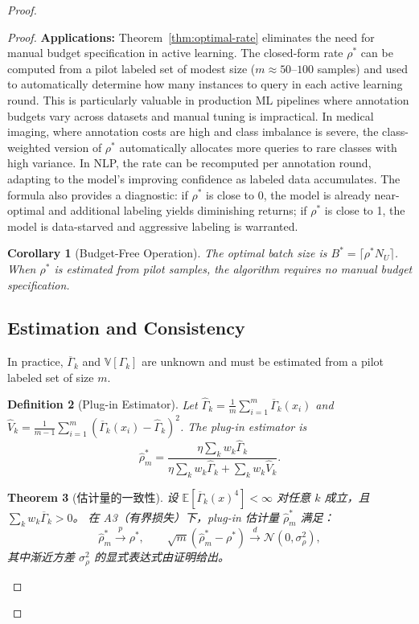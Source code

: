 \documentclass[12pt,a4paper]{article}
\newtheorem{theorem}{Theorem}[section]
\newtheorem{corollary}[theorem]{Corollary}
\newtheorem{definition}[theorem]{Definition}
\newcommand{\E}{\mathbb{E}}
\newcommand{\V}{\mathbb{V}}
\begin{document}
\begin{proof}
\begin{proof}
\medskip\noindent
\textbf{Applications:}
Theorem~\ref{thm:optimal-rate} eliminates the need for manual budget
specification in active learning.  The closed-form rate $\rho^*$ can be
computed from a pilot labeled set of modest size ($m\approx 50$--$100$ samples)
and used to automatically determine how many instances to query in each
active learning round.  This is particularly valuable in production ML pipelines
where annotation budgets vary across datasets and manual tuning is impractical.
In medical imaging, where annotation costs are high and class imbalance is
severe, the class-weighted version of $\rho^*$ automatically allocates more
queries to rare classes with high variance.  In NLP, the rate can be
recomputed per annotation round, adapting to the model's improving confidence
as labeled data accumulates.  The formula also provides a diagnostic: if
$\rho^*$ is close to 0, the model is already near-optimal and additional
labeling yields diminishing returns; if $\rho^*$ is close to 1, the model
is data-starved and aggressive labeling is warranted.

\begin{corollary}[Budget-Free Operation]
\label{cor:budget-free}
The optimal batch size is $B^* = \lceil\rho^* N_U\rceil$.  When $\rho^*$ is
estimated from pilot samples, the algorithm requires no manual budget
specification.
\end{corollary}

\subsection{Estimation and Consistency}

In practice, $\overline{\Gamma}_k$ and $\V[\Gamma_k]$ are unknown and must
be estimated from a pilot labeled set of size $m$.

\begin{definition}[Plug-in Estimator]
\label{def:plugin}
Let $\widehat{\Gamma}_k = \frac{1}{m}\sum_{i=1}^m \overline{\Gamma}_k(x_i)$
and $\widehat{V}_k = \frac{1}{m-1}\sum_{i=1}^m
(\overline{\Gamma}_k(x_i)-\widehat{\Gamma}_k)^2$.  The plug-in estimator is
\begin{equation}\label{eq:plugin}
    \hat{\rho}^*_m =
    \frac{\eta\sum_{k} w_k \widehat{\Gamma}_k}
         {\eta\sum_{k} w_k \widehat{\Gamma}_k
          + \sum_{k} w_k \widehat{V}_k}.
\end{equation}
\end{definition}

\begin{theorem}[估计量的一致性]
\label{thm:consistency}
设 $\E[\overline{\Gamma}_k(x)^4]<\infty$ 对任意 $k$ 成立，且 $\sum_k w_k\overline{\Gamma}_k>0$。
在 A3（有界损失）下，plug-in 估计量 $\hat{\rho}^*_m$ 满足：
\[
\hat{\rho}^*_m \xrightarrow{p} \rho^*,\qquad
\sqrt{m}(\hat{\rho}^*_m - \rho^*) \xrightarrow{d} \mathcal{N}(0,\sigma^2_\rho),
\]
其中渐近方差 $\sigma^2_\rho$ 的显式表达式由证明给出。
\end{theorem}


\end{proof}
\end{proof}
\end{document}
